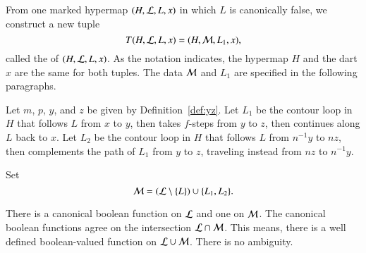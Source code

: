 \begin{definition}[transform]
  From one marked hypermap $(H,{\cal L},L,x)$ in which $L$ is
  canonically false, we construct a new tuple
\begin{displaymath}
T(H,{\cal L},L,x) = (H,{\cal M},L_1,x),
\end{displaymath}
 called the  of
  $(H,{\cal{L}},L,x)$.  
As the notation indicates, the hypermap $H$ and the dart $x$ are the same for both
tuples.  The data ${\cal M}$ and $L_1$ are specified in
the following paragraphs.
\end{definition}

Let $m$, $p$, $y$, and $z$ be  given by
Definition~\ref{def:yz}.
Let $L_1$ be 
the contour loop in $H$ that follows $L$ from $x$ to $y$, then takes
$f$-steps from $y$ to $z$, then continues along $L$ back to $x$.  
Let $L_2$ be
the contour loop in $H$ that follows $L$ from $n^{-1} y$ to $n z$,
then complements the path of $L_1$ from $y$ to $z$, traveling instead
from $n z$ to $n^{-1} y$. 


Set
\begin{displaymath}{\cal M} = ({\cal L}\setminus \{L\}) \cup
\{L_1,L_2\}.\end{displaymath}

\begin{remark}
There is a canonical boolean function on ${\cal L}$ and one on ${\cal M}$.
The canonical boolean functions agree on the intersection ${\cal L}\cap {\cal M}$.
This means, there is a well defined boolean-valued function on 
${\cal L}\cup {\cal M}$.  There is no ambiguity.  
\end{remark}
%





